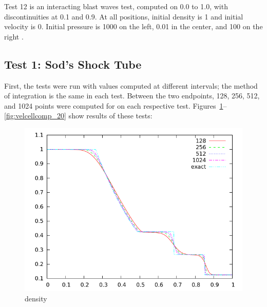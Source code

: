 \documentclass[letterpaper,12pt]{article}
\begin{document}
Test 12 is an interacting blast waves test, computed on 0.0 to 1.0, with discontinuities at 0.1 and 0.9. At all positions, initial density is 1 and initial velocity is 0. Initial pressure is 1000 on the left, 0.01 in the center, and 100 on the right \cite{LiskaWendroff2003}.

\subsection{Test 1: Sod's Shock Tube} 

First, the tests were run with values computed at different intervals; the method of integration is the same in each test. Between the two endpoints, 128, 256, 512, and 1024 points were computed for on each respective test. Figures~\ref{fig:dencellcomp_20}--\ref{fig:velcellcomp_20} show results of these tests:
\begin{figure}
  \begin{center}
    \includegraphics[width=.95\textwidth]{dencellcomp_20}
  \end{center}
  \caption{density}
  \label{fig:dencellcomp_20}
\end{figure}
\end{document}

